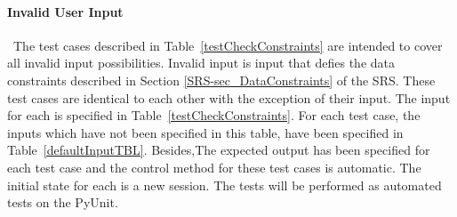 \documentclass[12pt, titlepage]{article}
\begin{document}

\paragraph{Invalid User Input}

~\newline \noindent The test cases described in Table~\ref{testCheckConstraints} 
are intended to cover all invalid input possibilities. Invalid input is input 
that defies the data constraints described in Section 
\ref{SRS-sec_DataConstraints} of the SRS. These test cases are identical to 
each other with the exception of their input. The input for each is specified 
in Table~\ref{testCheckConstraints}. For each test case, the inputs which have not been specified 
in this table, have been specified in Table~\ref{defaultInputTBL}. Besides,The
 expected output has been specified for each test case and the control method 
for these test cases is automatic. The initial state for each is a new session. 
The tests will be performed as automated tests on the PyUnit.
\end{document}

